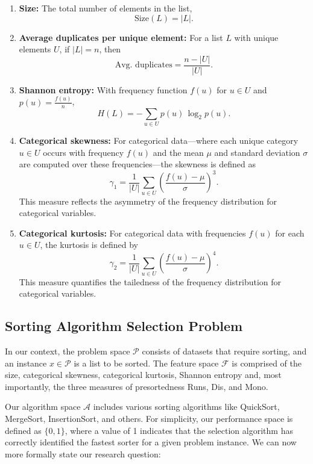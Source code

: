 \documentclass[twocolumn]{article}
\newcommand{\vsp}{\vspace{0.5em}}
\begin{document}
\begin{enumerate}[itemsep=0.05em, topsep=0pt]
    \item \textbf{Size:} The total number of elements in the list, 
    \[
    \text{Size}(L) = |L|.
    \]
    
    \item \textbf{Average duplicates per unique element:} For a list $L$ with unique elements 
    $U$, if $|L| = n$, then
    \[
    \text{Avg. duplicates} = \frac{n - |U|}{|U|}.
    \]
    
    \item \textbf{Shannon entropy:} With frequency function $f(u)$ for $u\in U$ and $p(u)=\frac{f(u)}{n}$,
    \[
    H(L) = -\sum_{u\in U} p(u)\,\log_2 p(u).
    \]
    
    \item \textbf{Categorical skewness:} For categorical data—where each unique category $u\in U$ occurs with frequency $f(u)$ and the mean $\mu$ and standard deviation $\sigma$ are computed over these frequencies—the skewness is defined as 
    \[
    \gamma_1 = \frac{1}{|U|}\sum_{u\in U}\left(\frac{f(u)-\mu}{\sigma}\right)^3.
    \]
    This measure reflects the asymmetry of the frequency distribution for categorical variables.

    \item \textbf{Categorical kurtosis:} For categorical data with frequencies $f(u)$ for each $u\in U$, the kurtosis is defined by
    \[
    \gamma_2 = \frac{1}{|U|}\sum_{u\in U}\left(\frac{f(u)-\mu}{\sigma}\right)^4.
    \]
    This measure quantifies the tailedness of the frequency distribution for categorical variables.

\end{enumerate}

\subsection{Sorting Algorithm Selection Problem}
In our context, the problem space $\mathcal{P}$ consists of datasets that require sorting, and an instance $x \in \mathcal{P}$ is a list to be sorted. The feature space $\mathcal{F}$ is comprised of the size, categorical skewness, categorical kurtosis, Shannon entropy and, most importantly, the three measures of presortedness Runs, Dis, and Mono.

\vsp

Our algorithm space $\mathcal{A}$ includes various sorting algorithms like QuickSort, MergeSort, InsertionSort, and others. For simplicity, our performance space is defined as $\{0,1\}$, where a value of 1 indicates that the selection algorithm has correctly identified the fastest sorter for a given problem instance. We can now more formally state our research question:
\end{document}
